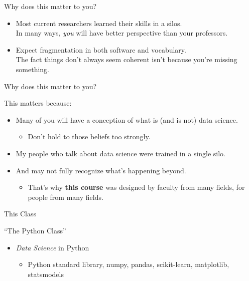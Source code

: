 \documentclass[11pt]{beamer}
\begin{document}
\begin{frame}[c]{Why does this matter to you?}
\begin{itemize}
	\item Most current researchers learned their skills in a silos. \\
	\pause In many ways, \alert{\emph{you} will have better perspective than your professors.}
	\pause \item Expect fragmentation in both software and vocabulary. \\
	\pause The fact things don't always seem coherent isn't because you're missing something.
\end{itemize}
\end{frame}


\begin{frame}[c]{Why does this matter to you?}

	This \alert{matters} because:
\begin{itemize}
	\item Many of you will have a conception of what is (and is not) data science.
	\begin{itemize}
		\pause \item Don't hold to those beliefs too strongly.
	\end{itemize}
	\pause \item My people who talk about data science were trained in a single silo.
	\pause \item And may not fully recognize what's happening beyond.
	\begin{itemize}
		\pause \item That's why \textbf{this course} was designed by faculty \alert{from many fields}, \alert{for people from many fields}.
	\end{itemize}
\end{itemize}
\end{frame}

\begin{frame}[c]{This Class}

``The Python Class'' \\

\begin{itemize}
	\pause \item \emph{Data Science} \alert{in} Python
	\begin{itemize}
		\pause \item Python standard library, numpy, pandas, scikit-learn, matplotlib, statsmodels
	\end{itemize}
\end{itemize}
\end{frame}
\end{document}
